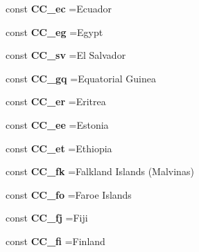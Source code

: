 \begin{DoxyCompactItemize}
const {\bfseries C\+C\+\_\+ec} =\textquotesingle{}Ecuador\textquotesingle{}
\item 
\hypertarget{class_i_s_o_ab0f2720ca304a0305b7d189699c9415e}{}\label{class_i_s_o_ab0f2720ca304a0305b7d189699c9415e} 
const {\bfseries C\+C\+\_\+eg} =\textquotesingle{}Egypt\textquotesingle{}
\item 
\hypertarget{class_i_s_o_a929fa5440b246819abbbeb59fed6fb85}{}\label{class_i_s_o_a929fa5440b246819abbbeb59fed6fb85} 
const {\bfseries C\+C\+\_\+sv} =\textquotesingle{}El Salvador\textquotesingle{}
\item 
\hypertarget{class_i_s_o_a3268501063bc2b2b0d9567f6bce8135c}{}\label{class_i_s_o_a3268501063bc2b2b0d9567f6bce8135c} 
const {\bfseries C\+C\+\_\+gq} =\textquotesingle{}Equatorial Guinea\textquotesingle{}
\item 
\hypertarget{class_i_s_o_a38979ca0802e11b060163e80ab0fb2c9}{}\label{class_i_s_o_a38979ca0802e11b060163e80ab0fb2c9} 
const {\bfseries C\+C\+\_\+er} =\textquotesingle{}Eritrea\textquotesingle{}
\item 
\hypertarget{class_i_s_o_a5653171d412c332d6909930a2fa3c58a}{}\label{class_i_s_o_a5653171d412c332d6909930a2fa3c58a} 
const {\bfseries C\+C\+\_\+ee} =\textquotesingle{}Estonia\textquotesingle{}
\item 
\hypertarget{class_i_s_o_acf7198276da921ec54159ec5330a255f}{}\label{class_i_s_o_acf7198276da921ec54159ec5330a255f} 
const {\bfseries C\+C\+\_\+et} =\textquotesingle{}Ethiopia\textquotesingle{}
\item 
\hypertarget{class_i_s_o_ac8fe50418e1a55e028e8c8c4e3fbd5e1}{}\label{class_i_s_o_ac8fe50418e1a55e028e8c8c4e3fbd5e1} 
const {\bfseries C\+C\+\_\+fk} =\textquotesingle{}Falkland Islands (Malvinas)\textquotesingle{}
\item 
\hypertarget{class_i_s_o_add6e76eae425e0beb2a7833ee4cf6434}{}\label{class_i_s_o_add6e76eae425e0beb2a7833ee4cf6434} 
const {\bfseries C\+C\+\_\+fo} =\textquotesingle{}Faroe Islands\textquotesingle{}
\item 
\hypertarget{class_i_s_o_aef42d08489b7d1ba23bbd8d6ee3627e1}{}\label{class_i_s_o_aef42d08489b7d1ba23bbd8d6ee3627e1} 
const {\bfseries C\+C\+\_\+fj} =\textquotesingle{}Fiji\textquotesingle{}
\item 
\hypertarget{class_i_s_o_a04b3a4fccbb018219f0ac2a8fc44a6c6}{}\label{class_i_s_o_a04b3a4fccbb018219f0ac2a8fc44a6c6} 
const {\bfseries C\+C\+\_\+fi} =\textquotesingle{}Finland\textquotesingle{}
\item 
\hypertarget{class_i_s_o_a82e5ff593bf7a90fc7807bf4f24bc2dc}{}\label{class_i_s_o_a82e5ff593bf7a90fc7807bf4f24bc2dc} 

\end{DoxyCompactItemize}
